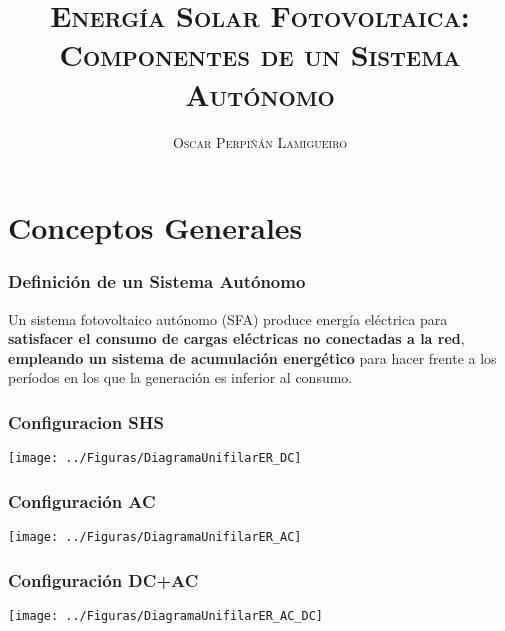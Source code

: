 \documentclass[serif, xcolor=dvipsnames]{beamer}
\begin{document}
\title[\textsc{ESF: Componentes SFA}]{\textsc{Energía Solar Fotovoltaica:}\\
\textsc{Componentes de un Sistema Autónomo}}


\author{\textsc{Oscar Perpiñán Lamigueiro}}
\date{}

\frame[plain]{\titlepage}


%

\section{Conceptos Generales}

\begin{frame}
\frametitle{Definición de un Sistema Autónomo}
\begin{block}
{}

Un sistema fotovoltaico autónomo (SFA) produce energía eléctrica para
\textbf{satisfacer el consumo de cargas eléctricas no conectadas a
la red}, \textbf{empleando un sistema de acumulación energético} para
hacer frente a los períodos en los que la generación es inferior al
consumo.

\end{block}

\end{frame}

\begin{frame}
\frametitle{Configuracion SHS}

\begin{center}
\texttt{[image: ../Figuras/DiagramaUnifilarER\_DC]}
\par\end{center}


\end{frame}

\begin{frame}
\frametitle{Configuración AC}

\begin{center}
\texttt{[image: ../Figuras/DiagramaUnifilarER\_AC]}
\par\end{center}


\end{frame}

\begin{frame}
\frametitle{Configuración DC+AC}

\begin{center}
\texttt{[image: ../Figuras/DiagramaUnifilarER\_AC\_DC]}
\par\end{center}


\end{frame}
\end{document}
